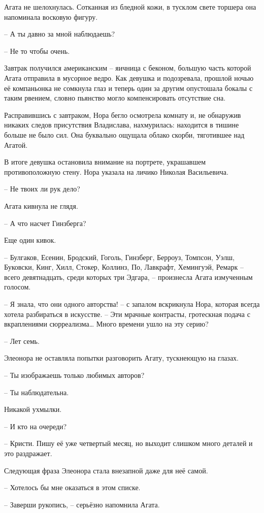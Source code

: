 \documentclass[
  a5paperpaper,
  DIV=11,
  numbers=noendperiod]{scrreprt}
\begin{document}
Агата не шелохнулась. Сотканная из бледной кожи, в тусклом свете торшера
она напоминала восковую фигуру.

-- А ты давно за мной наблюдаешь?

-- Не то чтобы очень.

Завтрак получился американским -- яичница с беконом, большую часть
которой Агата отправила в мусорное ведро. Как девушка и подозревала,
прошлой ночью её компаньонка не сомкнула глаз и теперь один за другим
опустошала бокалы с таким рвением, словно пьянство могло компенсировать
отсутствие сна.

Расправившись с завтраком, Нора бегло осмотрела комнату и, не обнаружив
никаких следов присутствия Владислава, нахмурилась: находится в тишине
больше не было сил. Она буквально ощущала облако скорби, тяготившее над
Агатой.

В итоге девушка остановила внимание на портрете, украшавшем
противоположную стену. Нора указала на личико Николая Васильевича.

-- Не твоих ли рук дело?

Агата кивнула не глядя.

-- А что насчет Гинзберга?

Еще один кивок.

-- Булгаков, Есенин, Бродский, Гоголь, Гинзберг, Берроуз, Томпсон, Уэлш,
Буковски, Кинг, Хилл, Стокер, Коллинз, По, Лавкрафт, Хемингуэй, Ремарк
-- всего девятнадцать, среди которых три Эдгара, -- произнесла Агата
измученным голосом.

-- Я знала, что они одного авторства! -- с запалом вскрикнула Нора,
которая всегда хотела разбираться в искусстве. -- Эти мрачные контрасты,
гротескная подача с вкраплениями сюрреализма\ldots{} Много времени ушло
на эту серию?

-- Лет семь.

Элеонора не оставляла попытки разговорить Агату, тускнеющую на глазах.

-- Ты изображаешь только любимых авторов?

-- Ты наблюдательна.

Никакой ухмылки.

-- И кто на очереди?

-- Кристи. Пишу её уже четвертый месяц, но выходит слишком много деталей
и это раздражает.

Следующая фраза Элеонора стала внезапной даже для неё самой.

-- Хотелось бы мне оказаться в этом списке.

-- Заверши рукопись, -- серьёзно напомнила Агата.
\end{document}
